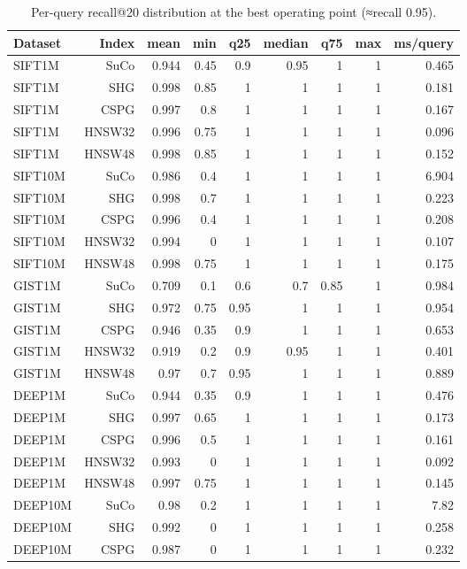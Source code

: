 \begin{table}[t]
\centering
\small
\caption{Per-query recall@20 distribution at the best operating point (≈recall 0.95).}
\label{tab:robustness}
\begin{tabular}{lrrrrrrrr}
\toprule
Dataset & Index & mean & min & q25 & median & q75 & max & ms/query \\
\midrule
SIFT1M & SuCo & 0.944 & 0.45 & 0.9 & 0.95 & 1 & 1 & 0.465 \\
SIFT1M & SHG & 0.998 & 0.85 & 1 & 1 & 1 & 1 & 0.181 \\
SIFT1M & CSPG & 0.997 & 0.8 & 1 & 1 & 1 & 1 & 0.167 \\
SIFT1M & HNSW32 & 0.996 & 0.75 & 1 & 1 & 1 & 1 & 0.096 \\
SIFT1M & HNSW48 & 0.998 & 0.85 & 1 & 1 & 1 & 1 & 0.152 \\
SIFT10M & SuCo & 0.986 & 0.4 & 1 & 1 & 1 & 1 & 6.904 \\
SIFT10M & SHG & 0.998 & 0.7 & 1 & 1 & 1 & 1 & 0.223 \\
SIFT10M & CSPG & 0.996 & 0.4 & 1 & 1 & 1 & 1 & 0.208 \\
SIFT10M & HNSW32 & 0.994 & 0 & 1 & 1 & 1 & 1 & 0.107 \\
SIFT10M & HNSW48 & 0.998 & 0.75 & 1 & 1 & 1 & 1 & 0.175 \\
GIST1M & SuCo & 0.709 & 0.1 & 0.6 & 0.7 & 0.85 & 1 & 0.984 \\
GIST1M & SHG & 0.972 & 0.75 & 0.95 & 1 & 1 & 1 & 0.954 \\
GIST1M & CSPG & 0.946 & 0.35 & 0.9 & 1 & 1 & 1 & 0.653 \\
GIST1M & HNSW32 & 0.919 & 0.2 & 0.9 & 0.95 & 1 & 1 & 0.401 \\
GIST1M & HNSW48 & 0.97 & 0.7 & 0.95 & 1 & 1 & 1 & 0.889 \\
DEEP1M & SuCo & 0.944 & 0.35 & 0.9 & 1 & 1 & 1 & 0.476 \\
DEEP1M & SHG & 0.997 & 0.65 & 1 & 1 & 1 & 1 & 0.173 \\
DEEP1M & CSPG & 0.996 & 0.5 & 1 & 1 & 1 & 1 & 0.161 \\
DEEP1M & HNSW32 & 0.993 & 0 & 1 & 1 & 1 & 1 & 0.092 \\
DEEP1M & HNSW48 & 0.997 & 0.75 & 1 & 1 & 1 & 1 & 0.145 \\
DEEP10M & SuCo & 0.98 & 0.2 & 1 & 1 & 1 & 1 & 7.82 \\
DEEP10M & SHG & 0.992 & 0 & 1 & 1 & 1 & 1 & 0.258 \\
DEEP10M & CSPG & 0.987 & 0 & 1 & 1 & 1 & 1 & 0.232 \\

\end{tabular}
\end{table}
